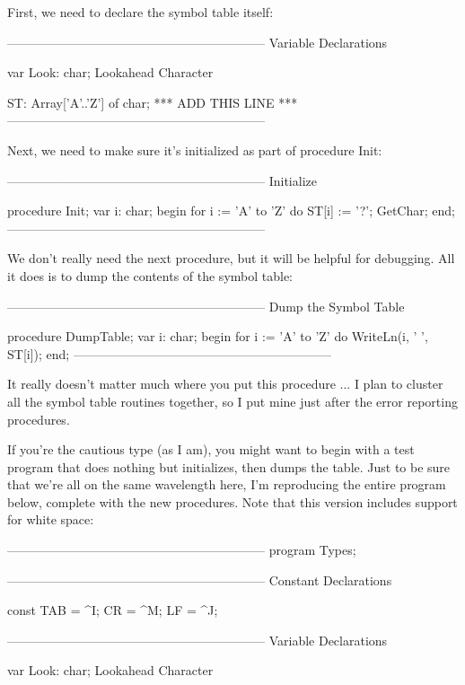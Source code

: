 \documentclass[float=false, crop=false]{standalone}
\begin{document}
First, we need to declare the symbol table itself:


{--------------------------------------------------------------}
{ Variable Declarations }

var Look: char;              { Lookahead Character }

    ST: Array['A'..'Z'] of char;   {  *** ADD THIS LINE ***}
{--------------------------------------------------------------}


Next, we need to make sure it's initialized as part of procedure Init:


{--------------------------------------------------------------}
{ Initialize }

procedure Init;
var i: char;
begin
   for i := 'A' to 'Z' do
      ST[i] := '?';
   GetChar;
end;
{--------------------------------------------------------------}


We don't really need the next procedure, but it will be helpful for debugging.
All it does is to dump the contents of the symbol table:


{--------------------------------------------------------------}
{ Dump the Symbol Table }

procedure DumpTable;
var i: char;
begin
   for i := 'A' to 'Z' do
      WriteLn(i, ' ', ST[i]);
end;
{--------------------------------------------------------------}


It really doesn't matter much where you put this procedure ... I plan to cluster
all the symbol table routines together, so I put mine just after the error
reporting procedures.

If you're the cautious type (as I am), you might want to begin with a test
program that does nothing but initializes, then dumps the table. Just to be sure
that we're all on the same wavelength here, I'm reproducing the entire program
below, complete with the new procedures. Note that this version includes support
for white space:


{--------------------------------------------------------------}
program Types;

{--------------------------------------------------------------}
{ Constant Declarations }

const TAB = ^I;
      CR  = ^M;
      LF  = ^J;

{--------------------------------------------------------------}
{ Variable Declarations }

var Look: char;              { Lookahead Character }
\end{document}
